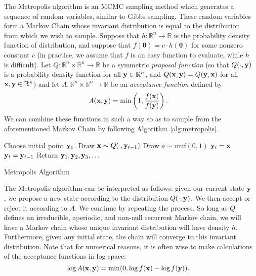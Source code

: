 The Metropolis algorithm is an MCMC sampling method which generates a sequence of random variables, similar to Gibbs sampling.
These random variables form a Markov Chain whose invariant distribution is equal to the distribution from which we wish
to sample. Suppose that $h : \mathbb{R}^n \rightarrow \mathbb{R}$ is the probability density function of distribution,
and suppose that $f(\boldsymbol{\theta}) = c \cdot h(\boldsymbol{\theta})$ for some nonzero constant $c$ (in practice, we assume that $f$ is an easy
function to evaluate, while $h$ is difficult). Let $Q : \mathbb{R}^n \times \mathbb{R}^n \rightarrow \mathbb{R}$ be
a symmetric \emph{proposal function}
(so that $Q(\cdot, \mathbf{y})$ is a probability density function for all $\mathbf{y} \in \mathbb{R}^n$,
 and $Q(\mathbf{x},\mathbf{y}) = Q(\mathbf{y},\mathbf{x})$ for all $\mathbf{x},\mathbf{y} \in \mathbb{R}^n$) and let
 $A : \mathbb{R}^n \times \mathbb{R}^n \rightarrow \mathbb{R}$ be an \emph{acceptance function} defined by
\[
A(\mathbf{x},\mathbf{y}) = \min\left(1, \frac{f(\mathbf{x})}{f(\mathbf{y})}\right).
\]
We can combine these functions in such a way so as to sample from the aforementioned Markov Chain by following Algorithm \ref{alg:metropolis}.
\begin{algorithm}
\begin{algorithmic}[1]
    \State \textrm{Choose initial point } $\mathbf{y}_0$.
        \State \textrm{Draw } $\mathbf{x} \sim Q(\cdot, \mathbf{y}_{t-1})$
        \State \textrm{Draw } $a \sim \text{unif}(0,1)$
            \State $\mathbf{y}_t = \mathbf{x}$
        \Else
            \State $\mathbf{y}_t = \mathbf{y}_{t-1}$
        \EndIf
    \EndFor
    \State \textrm{Return } $\mathbf{y}_1,\mathbf{y}_2,\mathbf{y}_3,\ldots$
\EndProcedure
\end{algorithmic}
\caption{Metropolis Algorithm}
\label{alg:metropolis}
\end{algorithm}
The Metropolis algorithm can be interpreted as follows:
given our current state $\mathbf{y}$, we propose a new state according to the distribution $Q(\cdot, \mathbf{y})$. We then accept or reject it according to $A$.  We continue by repeating the process. So long as $Q$ defines an irreducible, aperiodic, and non-null recurrent Markov chain, we will have a Markov chain whose unique invariant distribution will have density $h$. Furthermore, given any initial state, the chain will converge to this invariant distribution.
Note that for numerical reasons, it is often wise to make calculations of the acceptance functions in log space:
\[
\log A(\mathbf{x},\mathbf{y}) = \min(0, \log f(\mathbf{x}) - \log f(\mathbf{y})).
\]


